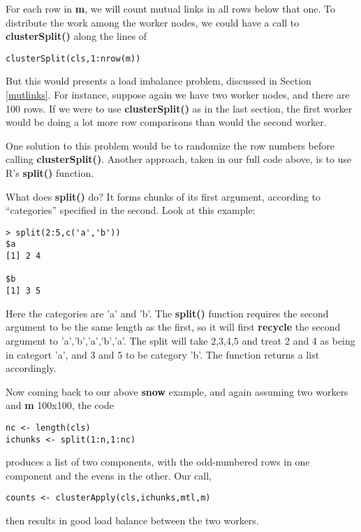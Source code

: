 For each row in {\bf m}, we will count mutual links in all rows below
that one.  To distribute the work among the worker nodes, we could have
a call to {\bf clusterSplit()} along the lines of

\begin{lstlisting}
clusterSplit(cls,1:nrow(m))
\end{lstlisting}

But this would presents a load imbalance problem, discussed in  Section
\ref{mutlinks}.  For instance, suppose again we have two worker nodes,
and there are 100 rows.  If we were to use {\bf clusterSplit()} as in
the last section, the first worker would be doing a lot more row
comparisons than would the second worker.

One solution to this problem would be to randomize the row numbers
before calling {\bf clusterSplit()}.  Another approach, taken in our
full code above, is to use R's {\bf split()} function.

What does {\bf split()} do?  It forms chunks of its first argument,
according to ``categories'' specified in the second.  Look at this
example:

\begin{lstlisting}
> split(2:5,c('a','b'))
$a
[1] 2 4

$b
[1] 3 5
\end{lstlisting}

Here the categories are 'a' and 'b'.  The {\bf split()} function
requires the second argument to be the same length as the first, so it
will first {\bf recycle} the second argument to 'a','b','a','b','a'.
The split will take 2,3,4,5 and treat 2 and 4 as being in categort 'a',
and 3 and 5 to be category 'b'.  The function returns a list
accordingly.

Now coming back to our above {\bf snow} example, and again assuming
two workers and  {\bf m} 100x100, the code

\begin{lstlisting}
nc <- length(cls)
ichunks <- split(1:n,1:nc)
\end{lstlisting}

produces a list of two components, with the odd-numbered rows in one
component and the evens in the other.  Our call,

\begin{lstlisting}
counts <- clusterApply(cls,ichunks,mtl,m)
\end{lstlisting}

then results in good load balance between the two workers.

